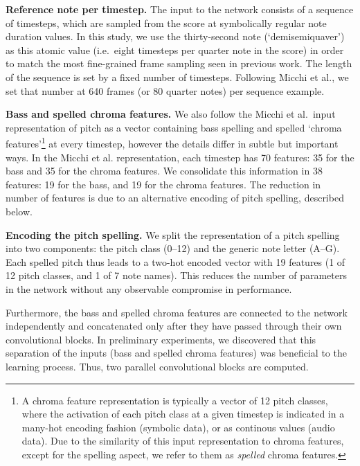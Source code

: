 

\textbf{Reference note per timestep.}
The input to the network consists of a sequence of
timesteps, which are sampled from the score at symbolically
regular note duration values. In this study, we use the
thirty-second note (`demisemiquaver') as this atomic value
(i.e.~eight timesteps per quarter note in the score) in
order to match the most fine-grained frame sampling seen in
previous work. The length of the sequence is set by a fixed
number of timesteps. Following Micchi et al., we set that
number at 640 frames (or 80 quarter notes) per sequence
example.

\textbf{Bass and spelled chroma features.}
We also follow the Micchi et al.~input representation of
pitch as a vector containing bass spelling and spelled
`chroma features'\footnote{A chroma feature representation
is typically a vector of 12 pitch classes, where the
activation of each pitch class at a given timestep is
indicated in a many-hot encoding fashion (symbolic data), or
as continous values (audio data). Due to the similarity of
this input representation to chroma features, except for the
spelling aspect, we refer to them as \emph{spelled} chroma
features.} at every timestep, however the details differ in
subtle but important ways. In the Micchi et al.
representation, each timestep has 70 features: 35 for the
bass and 35 for the chroma features. We consolidate this
information in 38 features: 19 for the bass, and 19 for the
chroma features. The reduction in number of features is due
to an alternative encoding of pitch spelling, described
below.

\textbf{Encoding the pitch spelling.}
We split the representation of a pitch spelling into two
components: the pitch class (0--12) and the generic note
letter (A--G). Each spelled pitch thus leads to a two-hot
encoded vector with 19 features (1 of 12 pitch classes, and
1 of 7 note names). This reduces the number of parameters in
the network without any observable compromise in
performance.

Furthermore, the bass and spelled chroma features are
connected to the network independently and concatenated only
after they have passed through their own convolutional
blocks. In preliminary experiments, we discovered that this
separation of the inputs (bass and spelled chroma features)
was beneficial to the learning process. Thus, two parallel
convolutional blocks are computed.
